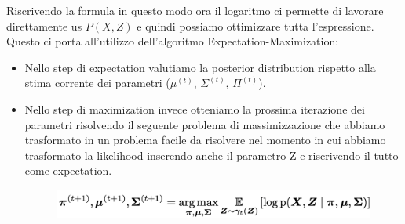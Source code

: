 \documentclass[14pt]{extreport}
\begin{document}
Riscrivendo la formula in questo modo ora il logaritmo ci permette di lavorare direttamente us $P(X,Z)$ e quindi possiamo ottimizzare tutta l'espressione.
Questo ci porta all'utilizzo dell'algoritmo Expectation-Maximization:
\begin{itemize}
\item Nello step di expectation valutiamo la posterior distribution rispetto alla stima corrente dei parametri ($\mu^{(t)}$, $\Sigma^{(t)}$, $\Pi^{(t)}$).
\item Nello step di maximization invece otteniamo la prossima iterazione dei parametri risolvendo il seguente problema di massimizzazione che abbiamo trasformato
in un problema facile da risolvere nel momento in cui abbiamo trasformato la likelihood inserendo anche il parametro Z e riscrivendo il tutto come expectation.

\begin{figure}[H] 
\centering
\includegraphics[width=0.7\linewidth]{552.jpeg}
\end{figure}
\end{itemize}
\end{document}
